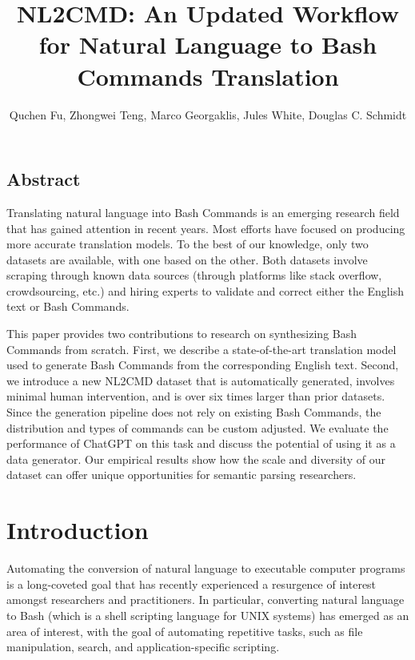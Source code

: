 \documentclass{river-journal}
\begin{document}
\begin{opening}
\title{NL2CMD: An Updated Workflow for Natural Language to Bash Commands Translation}
\author{Quchen Fu, Zhongwei Teng, Marco Georgaklis, Jules White, Douglas C. Schmidt}
\end{opening}



\subsection*{Abstract}
Translating natural language into Bash Commands is an emerging research field that has gained attention in recent years. Most efforts have focused on producing more accurate translation models. To the best of our knowledge, only two datasets are available, with one based on the other. Both datasets involve scraping through known data sources (through platforms like stack overflow, crowdsourcing, etc.) and hiring experts to validate and correct either the English text or Bash Commands. 

This paper provides two contributions to research on synthesizing Bash Commands from scratch. First, we describe a state-of-the-art translation model used to generate Bash Commands from the corresponding English text. Second, we introduce a new NL2CMD dataset that is automatically generated, involves minimal human intervention, and is over six times larger than prior datasets. Since the generation pipeline does not rely on existing Bash Commands, the distribution and types of commands can be custom adjusted. We evaluate the performance of ChatGPT on this task and discuss the potential of using it as a data generator. Our empirical results show how the scale and diversity of our dataset can offer unique opportunities for semantic parsing researchers. 


\section{Introduction}
Automating the conversion of natural language to executable computer programs is a long-coveted goal that has recently experienced a  resurgence of interest amongst researchers and practitioners. In particular, converting natural language to Bash (which is a shell scripting language for UNIX systems) has emerged as an area of interest, with the goal of automating repetitive tasks, such as file manipulation, search, and application-specific scripting. 
\end{document}
